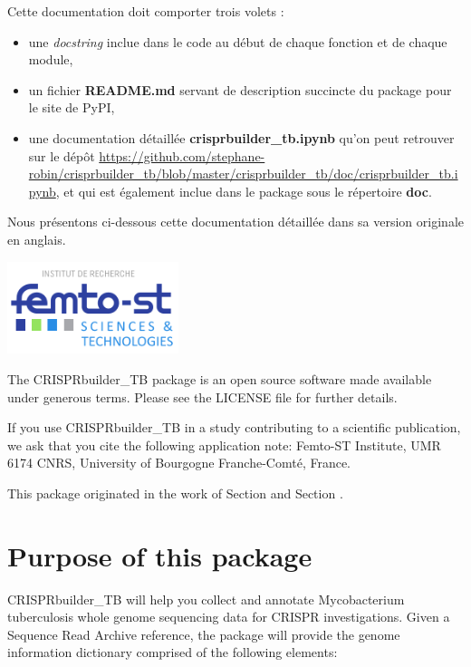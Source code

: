 \documentclass[twoside,a4paper,11pt,frenchb,openany]{report}
\begin{document}
Cette documentation doit comporter trois volets :
\begin{itemize}
\item une \textit{docstring} inclue dans le code au début de chaque fonction et de chaque module,
\item un fichier \textbf{README.md} servant de description succincte du package pour le site de PyPI,
\item une documentation détaillée \textbf{crisprbuilder\_tb.ipynb} qu'on peut retrouver sur le dépôt \url{https://github.com/stephane-robin/crisprbuilder_tb/blob/master/crisprbuilder_tb/doc/crisprbuilder_tb.ipynb}, et qui est également inclue dans le package sous le répertoire \textbf{doc}.
\end{itemize}   

Nous présentons ci-dessous cette documentation détaillée dans sa version originale en anglais.

\includegraphics[width=5cm]{femto.png}

The CRISPRbuilder\_TB package is an open source software made available
under generous terms. Please see the LICENSE file for further details.

If you use CRISPRbuilder\_TB in a study contributing to a scientific
publication, we ask that you cite the following application note:
Femto-ST Institute, UMR 6174 CNRS, University of Bourgogne
Franche-Comté, France.

This package originated in the work of Section \cite{guyeux1} and
Section \cite{guyeux2}.



    \section{Purpose of this package}\label{purpose-of-this-package}

    CRISPRbuilder\_TB will help you collect and annotate Mycobacterium
tuberculosis whole genome sequencing data for CRISPR investigations.
Given a Sequence Read Archive reference, the package will provide the
genome information dictionary comprised of the following elements:
\end{document}
